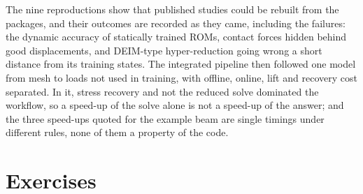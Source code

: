 The nine reproductions show that published studies could be rebuilt from the packages, and their outcomes are recorded as they came, including the failures: the dynamic accuracy of statically trained ROMs, contact forces hidden behind good displacements, and DEIM-type hyper-reduction going wrong a short distance from its training states. The integrated pipeline then followed one model from mesh to loads not used in training, with offline, online, lift and recovery cost separated. In it, stress recovery and not the reduced solve dominated the workflow, so a speed-up of the solve alone is not a speed-up of the answer; and the three speed-ups quoted for the example beam are single timings under different rules, none of them a property of the code.

\section*{Exercises}\label{sec:vf-exercises}

